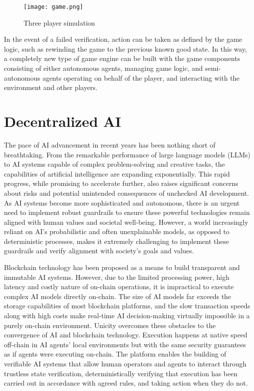 \documentclass{article}
\begin{document}
\begin{figure}[H]
    \centering
    \texttt{[image: game.png]}
    \caption{Three player simulation}
    \label{fig:game}
\end{figure}

In the event of a failed verification, action can be taken as defined by the game logic, such as rewinding the game to the previous known good state. In this way, a completely new type of game engine can be built with the game components consisting of either autonomous agents, managing game logic, and semi-autonomous agents operating on behalf of the player, and interacting with the environment and other players.

\section{Decentralized AI}



The pace of AI advancement in recent years has been nothing short of breathtaking. From the remarkable performance of large language models (LLMs) to AI systems capable of complex problem-solving and creative tasks, the capabilities of artificial intelligence are expanding exponentially. This rapid progress, while promising to accelerate further, also raises significant concerns about risks and potential unintended consequences of unchecked AI development. As AI systems become more sophisticated and autonomous, there is an urgent need to implement robust guardrails to ensure these powerful technologies remain aligned with human values and societal well-being. However, a world increasingly reliant on AI's probabilistic and often unexplainable models, as opposed to deterministic processes, makes it extremely challenging to implement these guardrails and verify alignment with society's goals and values.



Blockchain technology has been proposed as a means to build transparent and immutable AI systems. However, due to the limited processing power, high latency and costly nature of on-chain operations, it is impractical to execute complex AI models directly on-chain. The size of AI models far exceeds the storage capabilities of most blockchain platforms, and the slow transaction speeds along with high costs make real-time AI decision-making virtually impossible in a purely on-chain environment. Unicity overcomes these obstacles to the convergence of AI and blockchain technology. Execution happens at native speed off-chain in AI agents' local environments but with the same security guarantees as if agents were executing on-chain. The platform enables the building of verifiable AI systems that allow human operators and agents to interact through trustless state verification, deterministically verifying that execution has been carried out in accordance with agreed rules, and taking action when they do not.
\end{document}

